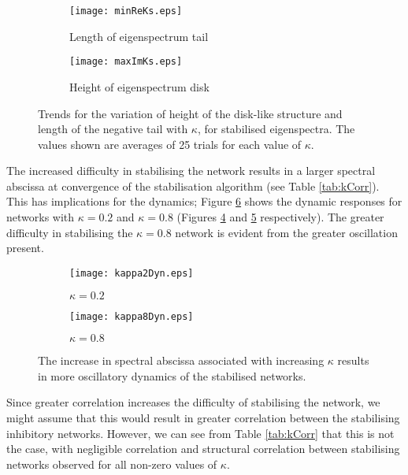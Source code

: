 \documentclass[12pt, a4paper]{article}
\begin{document}
\begin{figure}
    \begin{subfigure}{0.5\textwidth}
        \centering
        \texttt{[image: minReKs.eps]}
        \caption{Length of eigenspectrum tail}
        \label{fig:eigTail}
    \end{subfigure}
    \begin{subfigure}{0.5\textwidth}
        \centering
        \texttt{[image: maxImKs.eps]}
        \caption{Height of eigenspectrum disk}
        \label{fig:eigDisk}
    \end{subfigure}
    \caption{Trends for the variation of height of the disk-like structure and length of the negative tail with $\kappa$, for stabilised eigenspectra.  The values shown are averages of 25 trials for each value of $\kappa$.}
    \label{fig:kEigTrends}
\end{figure}
        

The increased difficulty in stabilising the network results in a larger spectral abscissa at convergence of the stabilisation algorithm (see Table \ref{tab:kCorr}).  This has implications for the dynamics;  Figure \ref{fig:kDyns} shows the dynamic responses for networks with $\kappa = 0.2$ and $\kappa = 0.8$ (Figures \ref{fig:k0.2Dyn} and \ref{fig:k0.8Dyn} respectively).  The greater difficulty in stabilising the $\kappa = 0.8$ network is evident from the greater oscillation present.  

\begin{figure}
    \begin{subfigure}{0.5\textwidth}
        \centering
        \texttt{[image: kappa2Dyn.eps]}
        \caption{$\kappa = 0.2$}
        \label{fig:k0.2Dyn}
    \end{subfigure}
    \begin{subfigure}{0.5\textwidth}
        \centering
        \texttt{[image: kappa8Dyn.eps]}
        \caption{$\kappa = 0.8$}
        \label{fig:k0.8Dyn}
    \end{subfigure}
    \caption{The increase in spectral abscissa associated with increasing $\kappa$ results in more oscillatory dynamics of the stabilised networks.}
    \label{fig:kDyns}
\end{figure}

Since greater correlation increases the difficulty of stabilising the network, we might assume that this would result in greater correlation between the stabilising inhibitory networks.  However, we can see from Table \ref{tab:kCorr} that this is not the case, with negligible correlation and structural correlation between stabilising networks observed for all non-zero values of $\kappa$.  
\end{document}
